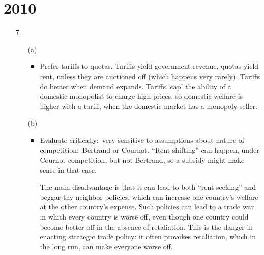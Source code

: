 \section*{2010}

\begin{enumerate}
\item [7.] 
\begin{enumerate}
	\item [(a)] 
	\begin{itemize}
		\item Prefer tariffs to quotas. Tariffs yield government revenue, quotas yield rent, unless they are auctioned off (which happens very rarely). Tariffs do better when demand expands. Tariffs `cap' the ability of a domestic monopolist to charge high prices, so domestic welfare is higher with a tariff, when the domestic market has a monopoly seller. \par{}
	\end{itemize}
	\item [(b)] 
	\begin{itemize}
		\item Evaluate critically:\ very sensitive to assumptions about nature of competition:\ Bertrand or Cournot. ``Rent-shifting'' can happen, under Cournot competition, but not Bertrand, so a subsidy might make sense in that case.

 The main disadvantage is that it can lead to both ``rent seeking'' and beggar-thy-neighbor policies, which can increase one country's welfare at the other country's expense. Such policies can lead to a trade war in which every country is worse off, even though one country could become better off in the absence of retaliation. This is the danger in enacting strategic trade policy: it often provokes retaliation, which in the long run, can make everyone worse off.
	 \par{}
	\end{itemize}


\end{enumerate}
\end{enumerate}
